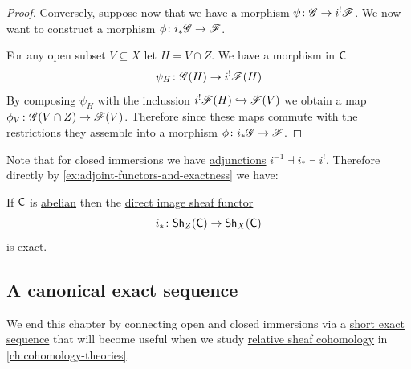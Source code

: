 \documentclass[../../main]{subfiles}
\begin{document}
\begin{proof}
  Conversely, suppose now that we have a morphism \(\psi\colon \mathscr{G} \to i^{!}\mathscr{F}\).
  We now want to construct a morphism \(\phi\colon i_{\ast}\mathscr{G} \to \mathscr{F}\).

  For any open subset \(V \subseteq X\) let \(H = V \cap Z\).
  We have a morphism in \(\mathsf{C}\)
  \begin{equation*}
    \psi_{H}\colon \mathscr{G}(H) \to i^{!}\mathscr{F}(H)
  \end{equation*}
  By composing \(\psi_{H}\) with the inclussion \(i^{!}\mathscr{F}(H) \hookrightarrow \mathscr{F}(V)\) we obtain a map \(\phi_{V}\colon \mathscr{G}(V \cap Z) \to \mathscr{F}(V)\).
  Therefore since these maps commute with the restrictions they assemble into a morphism \(\phi\colon i_{\ast}\mathscr{G} \to \mathscr{F}\).
\end{proof}

Note that for closed immersions we have \hyperref[def:adjoint-functors]{adjunctions} \hyperref[thm:closed-immersion-adjunction]{\(i^{-1} \dashv i_{\ast} \dashv i^{!}\)}.
Therefore directly by \autoref{ex:adjoint-functors-and-exactness} we have:
\begin{corollary}\label{cor:closed-immersion-exact}
  If \(\mathsf{C}\) is \hyperref[def:abelian-category]{abelian} then the \hyperref[def:direct-image-sheaf]{direct image sheaf functor}
  \begin{equation*}
    i_{\ast}\colon \mathsf{Sh}_{Z}(\mathsf{C}) \to \mathsf{Sh}_{X}(\mathsf{C})
  \end{equation*}
  is \hyperref[def:exact-functor]{exact}.
\end{corollary}

\subsection{A canonical exact sequence}

We end this chapter by connecting open and closed immersions via a \hyperref[def:exact-sequence]{short exact sequence} that will become useful when we study \hyperref[def:relative-sheaf-cohomology]{relative sheaf cohomology} in \autoref{ch:cohomology-theories}.
\end{document}
